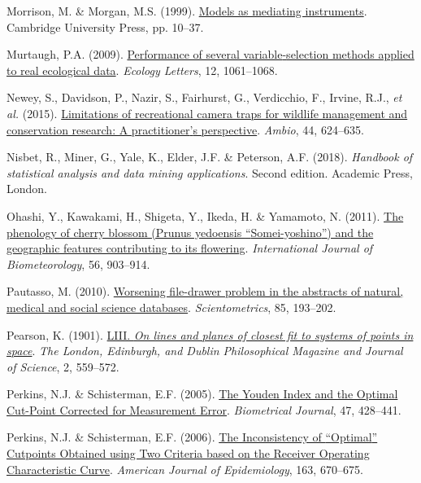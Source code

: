 \documentclass[
  letterpaper,
]{scrbook}
\newlength{\cslhangindent}
\newenvironment{CSLReferences}[2] %
 {\begin{list}{}{%
  \setlength{\itemindent}{0pt}
  \setlength{\leftmargin}{0pt}
  \setlength{\parsep}{0pt}
  \ifodd #1
   \setlength{\leftmargin}{\cslhangindent}
   \setlength{\itemindent}{-1\cslhangindent}
  \fi
  \setlength{\itemsep}{#2\baselineskip}}}
 {\end{list}}
\begin{document}
\begin{CSLReferences}{1}{0}
Morrison, M. \& Morgan, M.S. (1999).
\href{https://doi.org/10.1017/cbo9780511660108.003}{Models as mediating
instruments}. Cambridge University Press, pp. 10--37.

Murtaugh, P.A. (2009).
\href{https://doi.org/10.1111/j.1461-0248.2009.01361.x}{Performance of
several variable{-}selection methods applied to real ecological data}.
\emph{Ecology Letters}, 12, 1061--1068.

Newey, S., Davidson, P., Nazir, S., Fairhurst, G., Verdicchio, F.,
Irvine, R.J., \emph{et al.} (2015).
\href{https://doi.org/10.1007/s13280-015-0713-1}{Limitations of
recreational camera traps for wildlife management and conservation
research: A practitioner{'}s perspective}. \emph{Ambio}, 44, 624--635.

Nisbet, R., Miner, G., Yale, K., Elder, J.F. \& Peterson, A.F. (2018).
\emph{Handbook of statistical analysis and data mining applications}.
Second edition. Academic Press, London.

Ohashi, Y., Kawakami, H., Shigeta, Y., Ikeda, H. \& Yamamoto, N. (2011).
\href{https://doi.org/10.1007/s00484-011-0496-4}{The phenology of cherry
blossom (Prunus yedoensis {``}Somei-yoshino{''}) and the geographic
features contributing to its flowering}. \emph{International Journal of
Biometeorology}, 56, 903--914.

Pautasso, M. (2010).
\href{https://doi.org/10.1007/s11192-010-0233-5}{Worsening file-drawer
problem in the abstracts of natural, medical and social science
databases}. \emph{Scientometrics}, 85, 193--202.

Pearson, K. (1901).
\href{https://doi.org/10.1080/14786440109462720}{LIII. {\emph{On lines
and planes of closest fit to systems of points in space}}}. \emph{The
London, Edinburgh, and Dublin Philosophical Magazine and Journal of
Science}, 2, 559--572.

Perkins, N.J. \& Schisterman, E.F. (2005).
\href{https://doi.org/10.1002/bimj.200410133}{The Youden Index and the
Optimal Cut-Point Corrected for Measurement Error}. \emph{Biometrical
Journal}, 47, 428--441.

Perkins, N.J. \& Schisterman, E.F. (2006).
\href{https://doi.org/10.1093/aje/kwj063}{The Inconsistency of
{``}Optimal{''} Cutpoints Obtained using Two Criteria based on the
Receiver Operating Characteristic Curve}. \emph{American Journal of
Epidemiology}, 163, 670--675.


\end{CSLReferences}
\end{document}

